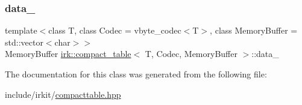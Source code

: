 \mbox{\label{classirk_1_1compact__table_a8a8f2eccb0ccc0258c158c51dfbfdbaa}} 
\subsubsection{\texorpdfstring{data\+\_\+}{data\_}}
{\footnotesize\ttfamily template$<$class T, class Codec = vbyte\+\_\+codec$<$\+T$>$, class Memory\+Buffer = std\+::vector$<$char$>$$>$ \\
Memory\+Buffer \mbox{\hyperlink{classirk_1_1compact__table}{irk\+::compact\+\_\+table}}$<$ T, Codec, Memory\+Buffer $>$\+::data\+\_\+\hspace{0.3cm}{\ttfamily [protected]}}



The documentation for this class was generated from the following file\+:\begin{DoxyCompactItemize}
\item 
include/irkit/\mbox{\hyperlink{compacttable_8hpp}{compacttable.\+hpp}}\end{DoxyCompactItemize}
